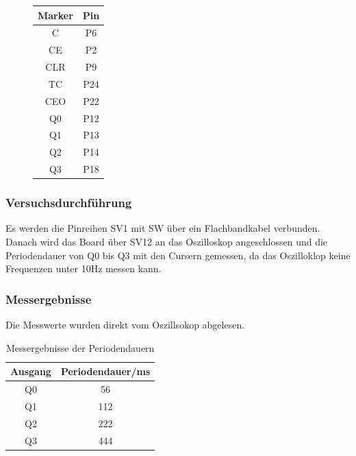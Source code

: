 \documentclass[12pt,a4paper]{article}
\begin{document}
\begin{figure}[H]
\centering
\begin{tabular}{|c|c|}
\hline Marker & Pin \\ \hline
\hline C & P6 \\ 
\hline CE & P2 \\ 
\hline CLR & P9 \\ 
\hline TC & P24 \\ 
\hline CEO & P22 \\ 
\hline Q0 & P12 \\ 
\hline Q1 & P13 \\ 
\hline Q2 & P14 \\ 
\hline Q3 & P18 \\ 
\hline 
\end{tabular} 
\end{figure}


\subsubsection*{Versuchsdurchführung}

Es werden die Pinreihen SV1 mit SW über ein Flachbandkabel verbunden. Danach wird das Board über SV12 an das Oszilloskop angeschlossen und die Periodendauer von Q0 bis Q3 mit den Cursern gemessen, da das Oszilloklop keine Frequenzen unter 10Hz messen kann.

\subsubsection*{Messergebnisse}

Die Messwerte wurden direkt vom Oszillsokop abgelesen.

\begin{table}[H]
\centering
\begin{tabular}{|c|c|}
\hline Ausgang & Periodendauer/ms \\ \hline
\hline Q0 & 56 \\ 
\hline Q1 & 112 \\ 
\hline Q2 & 222 \\ 
\hline Q3 & 444 \\ 
\hline 

\end{tabular}
\caption{Messergebnisse der Periodendauern}
\label{tab:periode}
\end{table} 
\end{document}
